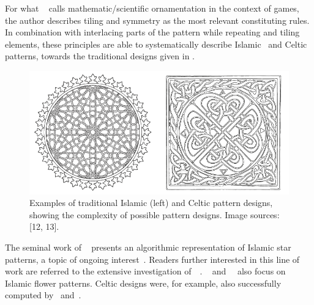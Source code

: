 For what \citeauthor*{whitehead_2010_tpd}~\cite{whitehead_2010_tpd} calls mathematic/scientific ornamentation in the context of games, the author 
% 
describes tiling and symmetry as the most relevant constituting rules. In combination with interlacing parts of the pattern while repeating and tiling elements, these principles are able to systematically describe Islamic~\cite{ostromoukhov_1998_mtc} and Celtic~\cite{cromwell_1993_ckm} patterns, towards the traditional designs given in .

\begin{figure}
\centering
    \includegraphics[width=0.9\columnwidth]{figures/islamic_celtic_ornament_01.png}
    \caption[Islamic and Celtic pattern designs]{Examples of traditional Islamic (left) and Celtic pattern designs, showing the complexity of possible pattern designs. Image sources: [12, 13].}
\label{fig:islamic_celtic_ornament}
\end{figure}

The seminal work of \citeauthor*{kaplan_2004_isp}~\cite{kaplan_2004_isp} presents an algorithmic representation of Islamic star patterns, a topic of ongoing interest~\cite{khamjane_2018_giq}. Readers further interested in this line of work are referred to the extensive investigation of~\citeauthor*{kaplan_2002_cgg}~\cite{kaplan_2002_cgg}. \citeauthor*{etemad_2008_apf}~\cite{etemad_2008_apf} and~\citeauthor*{hamekasi_2012_dpf}~\cite{hamekasi_2012_dpf} also focus on Islamic flower patterns. Celtic designs were, for example, also successfully computed by~\citeauthor*{kaplan_2003_cgc} and~\cite{doyle_2013_ccc}.

